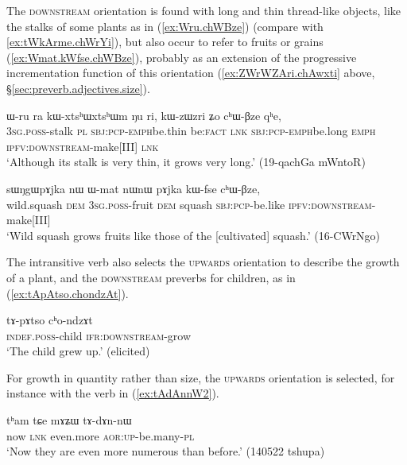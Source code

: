 The \textsc{downstream} orientation is found with long and thin thread-like objects, like the stalks of some plants as in (\ref{ex:Wru.chWBze}) (compare with \ref{ex:tWkArme.chWrYi}), but also occur to refer to fruits or grains (\ref{ex:Wmat.kWfse.chWBze}), probably as an extension of the progressive incrementation function of this orientation (\ref{ex:ZWrWZAri.chAwxti} above, §\ref{sec:preverb.adjectives.size}).

  \begin{exe}
\ex \label{ex:Wru.chWBze}
\gll   ɯ-ru ra kɯ-xtsʰɯ\redp{}xtsʰɯm ŋu ri, kɯ-zɯ\redp{}zri ʑo cʰɯ-βze qʰe,  \\
  \textsc{3sg}.\textsc{poss}-stalk \textsc{pl} \textsc{sbj}:\textsc{pcp}-\textsc{emph}\redp{}be.thin be:\textsc{fact} \textsc{lnk}  \textsc{sbj}:\textsc{pcp}-\textsc{emph}\redp{}be.long \textsc{emph} \textsc{ipfv}:\textsc{downstream}-make[III] \textsc{lnk} \\
\glt `Although its stalk is very thin, it grows very long.' (19-qachGa mWntoR)
  \end{exe}
  
\begin{exe}
\ex \label{ex:Wmat.kWfse.chWBze}
\gll    sɯŋgɯpɤjka nɯ ɯ-mat nɯnɯ pɤjka kɯ-fse cʰɯ-βze,    \\
wild.squash \textsc{dem} \textsc{3sg}.\textsc{poss}-fruit \textsc{dem} squash \textsc{sbj}:\textsc{pcp}-be.like \textsc{ipfv}:\textsc{downstream}-make[III] \\
\glt `Wild squash grows fruits like those of the [cultivated] squash.' (16-CWrNgo)
\end{exe}

The intransitive verb  also selects the \textsc{upwards} orientation to describe the growth of a plant, and the \textsc{downstream} preverbs for children, as in (\ref{ex:tApAtso.chondzAt}).

\begin{exe}
\ex \label{ex:tApAtso.chondzAt}
\gll   tɤ-pɤtso cʰo-ndzɤt \\
\textsc{indef}.\textsc{poss}-child \textsc{ifr}:\textsc{downstream}-grow \\
\glt  `The child grew up.' (elicited)
\end{exe}

For growth in quantity rather than size, the \textsc{upwards} orientation is selected, for instance with the verb  in (\ref{ex:tAdAnnW2}).

\begin{exe}
\ex \label{ex:tAdAnnW2}
\gll  tʰam tɕe mɤʑɯ tɤ-dɤn-nɯ  \\
now \textsc{lnk} even.more \textsc{aor}:\textsc{up}-be.many-\textsc{pl}  \\
\glt `Now they are even more numerous than before.' (140522 tshupa) 
\end{exe}

